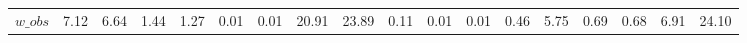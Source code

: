 \begin{center}
\begin{longtable}{lccccccccccccccccc}
$w\_obs         $	 & 	            7.12	 & 	            6.64	 & 	            1.44	 & 	            1.27	 & 	            0.01	 & 	            0.01	 & 	           20.91	 & 	           23.89	 & 	            0.11	 & 	            0.01	 & 	            0.01	 & 	            0.46	 & 	            5.75	 & 	            0.69	 & 	            0.68	 & 	            6.91	 & 	           24.10 \\ 
\end{longtable}
 \end{center}
